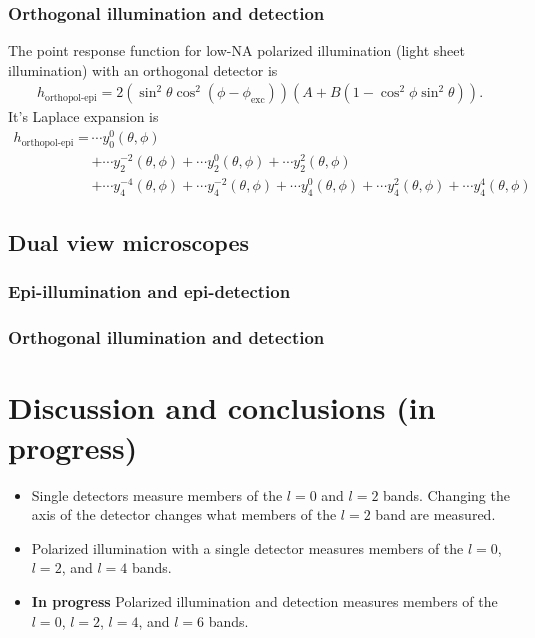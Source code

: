 \documentclass[10pt]{article}
\begin{document}
\subsubsection{Orthogonal illumination and detection}
The point response function for low-NA polarized illumination (light sheet
illumination) with an orthogonal detector is
\begin{align}
  h_{\text{orthopol-epi}} = 2(\sin^2\theta\cos^2(\phi - \phi_{\text{exc}}))(A + B(1 - \cos^2\phi\sin^2\theta)).
\end{align}
It's Laplace expansion is
\begin{align*}
  h_{\text{orthopol-epi}} = &\cdots y_0^0(\theta, \phi)\\
                            &+ \cdots y_2^{-2}(\theta, \phi)
                            + \cdots y_2^0(\theta, \phi)
                            + \cdots y_2^2(\theta, \phi)\\
                            &+ \cdots y_4^{-4}(\theta, \phi)
                            + \cdots y_4^{-2}(\theta, \phi)
                            + \cdots y_4^0(\theta, \phi)
                            + \cdots y_4^2(\theta, \phi)
                            + \cdots y_4^4(\theta, \phi)
  \end{align*}

\subsection{Dual view microscopes}
\subsubsection{Epi-illumination and epi-detection}
\subsubsection{Orthogonal illumination and detection}
\section{Discussion and conclusions (in progress)}
\begin{itemize}
\item Single detectors measure members of the $l=0$ and $l=2$ bands. Changing the axis of the detector changes what members of the $l=2$ band are measured. 
\item Polarized illumination with a single detector measures members of the $l=0$, $l=2$, and $l=4$ bands.
\item \textbf{In progress} Polarized illumination and detection measures members of the $l=0$, $l=2$, $l=4$, and $l=6$ bands. 
\end{itemize}
\end{document}

